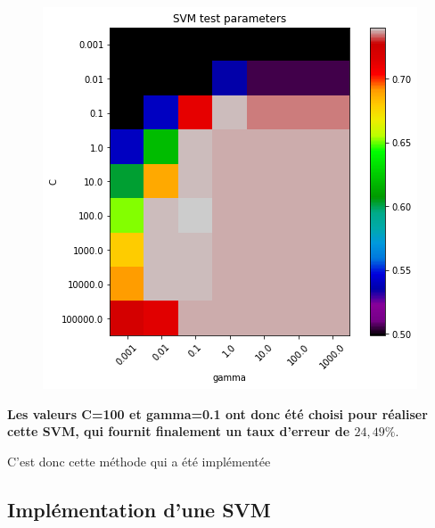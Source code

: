 \begin{figure}[!h]
\centering
\includegraphics{src/annexes/POC_FindStance_V2/output_24_0.png}
\end{figure}

\textbf{Les valeurs C=100 et gamma=0.1 ont donc été choisi pour réaliser cette SVM, qui fournit finalement un taux d'erreur de $24,49\%$}.

C'est donc cette méthode qui a été implémentée
\subsection{Implémentation d'une SVM}




